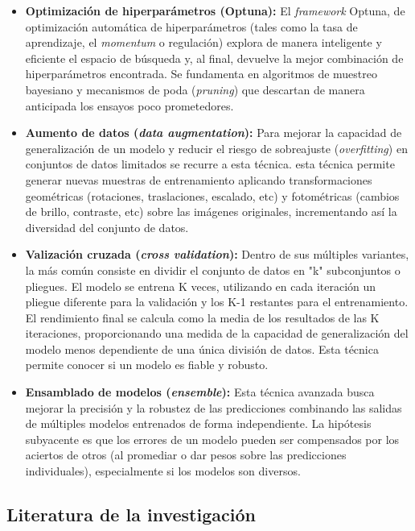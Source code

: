 \documentclass[12pt,a4paper,onecolumn,oneside]{report}
\begin{document}
\begin{itemize}
  \item \textbf{Optimización de hiperparámetros (Optuna):} El \textit{framework} Optuna, de optimización automática de hiperparámetros (tales como la tasa de aprendizaje, el \textit{momentum} o regulación) explora de manera inteligente y eficiente el espacio de búsqueda y, al final, devuelve la mejor combinación de hiperparámetros encontrada. Se fundamenta en algoritmos de muestreo bayesiano y mecanismos de poda (\textit{pruning}) que descartan de manera anticipada los ensayos poco prometedores.
  \item \textbf{Aumento de datos (\textit{data augmentation}):} Para mejorar la capacidad de generalización de un modelo y reducir el riesgo de sobreajuste (\textit{overfitting}) en conjuntos de datos limitados se recurre a esta técnica. esta técnica permite generar nuevas muestras de entrenamiento aplicando transformaciones geométricas (rotaciones, traslaciones, escalado, etc) y fotométricas (cambios de brillo, contraste, etc) sobre las imágenes originales, incrementando así la diversidad del conjunto de datos.
  \item \textbf{Valización cruzada (\textit{cross validation}):} Dentro de sus múltiples variantes, la más común consiste en dividir el conjunto de datos en "k" subconjuntos o pliegues. El modelo se entrena K veces, utilizando en cada iteración un pliegue diferente para la validación y los K-1 restantes para el entrenamiento. El rendimiento final se calcula como la media de los resultados de las K iteraciones, proporcionando una medida de la capacidad de generalización del modelo menos dependiente de una única división de datos. Esta técnica permite conocer si un modelo es fiable y robusto.
  \item \textbf{Ensamblado de modelos (\textit{ensemble}):} Esta técnica avanzada busca mejorar la precisión y la robustez de las predicciones combinando las salidas de múltiples modelos entrenados de forma independiente. La hipótesis subyacente es que los errores de un modelo pueden ser compensados por los aciertos de otros (al promediar o dar pesos sobre las predicciones individuales), especialmente si los modelos son diversos.
\end{itemize}

\subsection{Literatura de la investigación}
\end{document}
